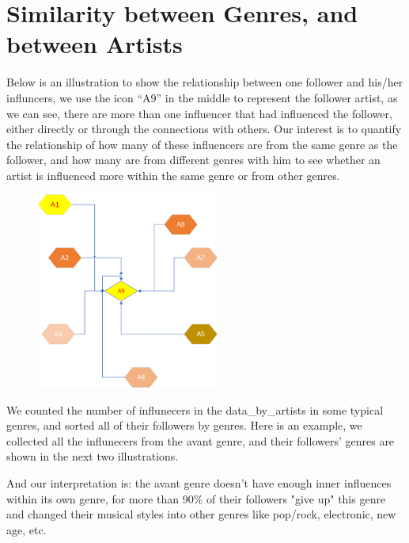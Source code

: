 \documentclass[12pt]{article}
\begin{document}
\section{Similarity between Genres, and between Artists}\quad\;
Below is an illustration to show the relationship between one follower and his/her influncers, we use the icon ``A9'' in the middle to represent the follower artist, as we can see, there are more than one influencer that had influenced the follower, either directly or through the connections with others. Our interest is to quantify the relationship of how many of these influencers are from the same genre as the follower, and how many are from different genres with him to see whether an artist is influenced more within the same genre or from other genres. 

\begin{figure}[h]
\centering
\includegraphics[width=6cm]{mind1.png}
\end{figure}





We counted the number of influnecers in the data\_by\_artists in some typical genres, and sorted all of their followers by genres.
Here is an example, we collected all the influnecers from the avant genre, and their followers' genres are shown in the next two illustrations. 

And our interpretation is: the avant genre doesn't have enough inner influences within its own genre, for more than 90\% of their followers "give up" this genre and changed their musical styles into other genres like pop/rock, electronic, new age, etc.
\end{document}
